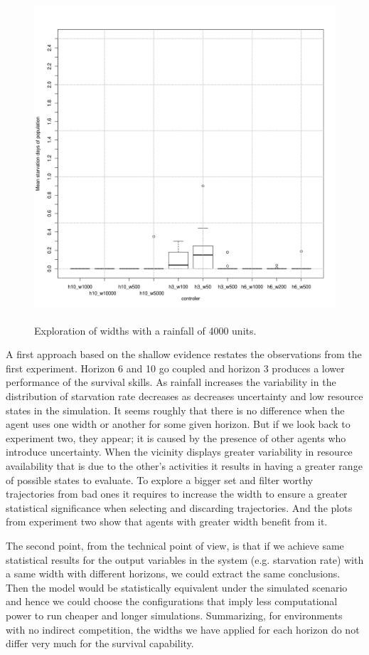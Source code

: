 \documentclass[11pt,oneside,a4paper,openright]{report}
\begin{document}
\begin{figure}[!htb]
\centering
\includegraphics[height=12.2cm]{figures/expm/ecsi3_clim4000}
\caption{Exploration of widths with a rainfall of 4000 units.}
\label{fig:ecsi3_clim4000}
\end{figure}


A first approach based on the shallow evidence restates the observations from the first experiment. Horizon 6 and 10 go coupled and horizon 3 produces a lower performance of the survival skills. As rainfall increases the variability in the distribution of starvation rate decreases as decreases uncertainty and low resource states in the simulation.
It seems roughly that there is no difference when the agent uses one width or another for some given horizon. But if we look back to experiment two, they appear; it is caused by the presence of other agents who introduce uncertainty. 
When the vicinity displays greater variability in resource availability that is due to the other's activities it results in having a greater range of possible states to evaluate. To explore a bigger set and filter worthy trajectories from bad ones it requires to increase the width to ensure a greater statistical significance when selecting and discarding trajectories. And the plots from experiment two show that agents with greater width benefit from it.

The second point, from the technical point of view, is that if we achieve same statistical results for the output variables in the system (e.g. starvation rate) with a same width with different horizons, we could extract the same conclusions. Then the model would be statistically equivalent under the simulated scenario and hence we could choose the configurations that imply less computational power to run cheaper and longer simulations.
Summarizing, for environments with no indirect competition, the widths we have applied for each horizon do not differ very much for the survival capability.
\end{document}
